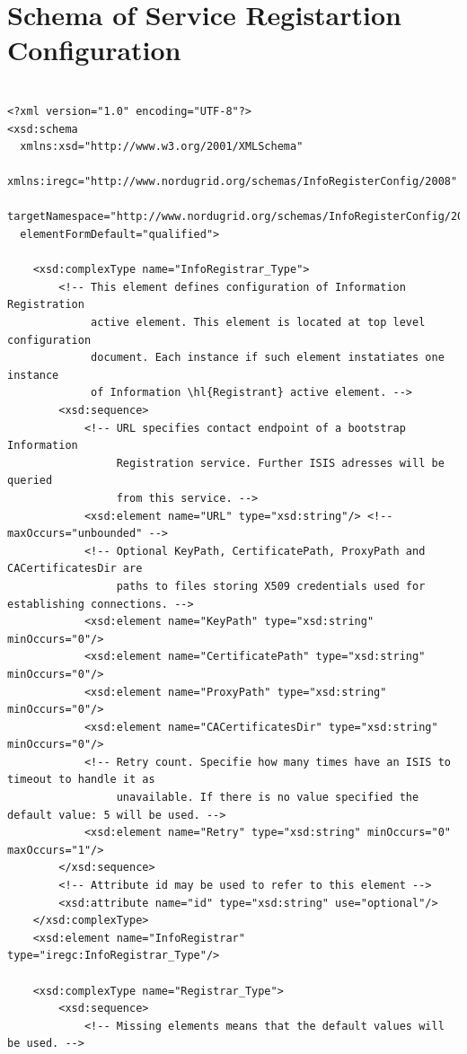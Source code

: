 \documentclass{book}
\begin{document}
\section{Schema of Service Registartion Configuration}
\label{annex:service_configuration_schema}
\begin{verbatim}

<?xml version="1.0" encoding="UTF-8"?>
<xsd:schema
  xmlns:xsd="http://www.w3.org/2001/XMLSchema"
  xmlns:iregc="http://www.nordugrid.org/schemas/InfoRegisterConfig/2008"
  targetNamespace="http://www.nordugrid.org/schemas/InfoRegisterConfig/2008"
  elementFormDefault="qualified">

    <xsd:complexType name="InfoRegistrar_Type">
        <!-- This element defines configuration of Information Registration
             active element. This element is located at top level configuration
             document. Each instance if such element instatiates one instance
             of Information \hl{Registrant} active element. -->
        <xsd:sequence>
            <!-- URL specifies contact endpoint of a bootstrap Information
                 Registration service. Further ISIS adresses will be queried
                 from this service. -->
            <xsd:element name="URL" type="xsd:string"/> <!-- maxOccurs="unbounded" -->
            <!-- Optional KeyPath, CertificatePath, ProxyPath and CACertificatesDir are
                 paths to files storing X509 credentials used for establishing connections. -->
            <xsd:element name="KeyPath" type="xsd:string" minOccurs="0"/>
            <xsd:element name="CertificatePath" type="xsd:string" minOccurs="0"/>
            <xsd:element name="ProxyPath" type="xsd:string" minOccurs="0"/>
            <xsd:element name="CACertificatesDir" type="xsd:string" minOccurs="0"/>
            <!-- Retry count. Specifie how many times have an ISIS to timeout to handle it as
                 unavailable. If there is no value specified the default value: 5 will be used. -->
            <xsd:element name="Retry" type="xsd:string" minOccurs="0" maxOccurs="1"/>
        </xsd:sequence>
        <!-- Attribute id may be used to refer to this element -->
        <xsd:attribute name="id" type="xsd:string" use="optional"/>
    </xsd:complexType>
    <xsd:element name="InfoRegistrar" type="iregc:InfoRegistrar_Type"/>

    <xsd:complexType name="Registrar_Type">
        <xsd:sequence>
            <!-- Missing elements means that the default values will be used. -->


\end{verbatim}
\end{document}
